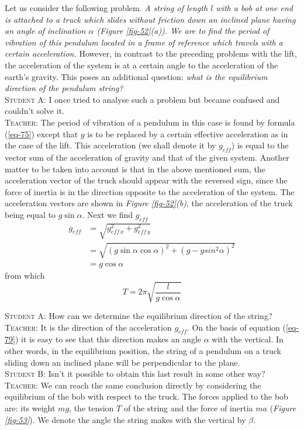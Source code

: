 \documentclass[a4paper,sfsidenotes]{tufte-book}
\begin{document}
Let us consider the following problem. \emph{A string of length $l$ with a bob at one end is attached to a truck which slides without friction down an inclined plane having an angle of inclination $\alpha$ (\emph{Figure \ref{fig-52}(a)}). We are to find the period of vibration of this pendulum located in a frame of reference which travels with a certain acceleration.} However, in contrast to the preceding problems with the lift, the acceleration of the system is at a certain angle to the acceleration of the earth's gravity. This poses an additional question: \emph{what is the equilibrium direction of the pendulum string?}
\\
\textsc{Student A:} I once tried to analyse such a problem but became confused and couldn't solve it.
\\
\textsc{Teacher:} The period of vibration of a pendulum in this case is found by formula (\ref{eq-75}) except that $g$ is to be replaced by a certain effective acceleration as in the case of the lift. This acceleration (we shall denote it by $g_{eff}$) is equal to the vector sum of the acceleration of gravity and that of the given system. Another matter to be taken into account is that in the above mentioned sum, the acceleration vector of the truck should appear with the reversed sign, since the force of inertia is in the direction opposite to the acceleration of the system. The acceleration vectors are shown in \emph{Figure \ref{fig-52}(b)}, the acceleration of the truck being equal to $g \sin \alpha$. Next we find $g_{eff}$
\\
\begin{equation}
\begin{split}
g_{eff} & = \sqrt{g_{eff \,x}^{2} + g_{eff \,y}^{2}} \\
& = \sqrt{ (g \sin \alpha \cos \alpha)^{2} + (g-g sin^{2}\alpha)^{2} }\\
& = g \cos \alpha
\end{split}
\label{eq-79}
\end{equation}
from which
\\
\begin{equation}
T = 2 \pi \sqrt{\frac{l}{g \cos \alpha}}
\label{80}
\end{equation}

\textsc{Student A:} How can we determine the equilibrium direction of the string?
\\
\textsc{Teacher:} It is the direction of the acceleration $g_{eff}$. On the basis of equation (\ref{eq-79}) it is easy to see that this direction makes an angle $\alpha$ with the vertical. In other words, in the equilibrium position, the string of a pendulum on a truck sliding down an inclined plane will be perpendicular to the plane.
\\
\textsc{Student B:} Isn't it possible to obtain this last result in some other way?
\\
\textsc{Teacher:} We can reach the same conclusion directly by considering the equilibrium of the bob with respect to the truck. The forces applied to the bob are: its weight $mg$, the tension $T$ of the string and the force of inertia $ma$ (\emph{Figure \ref{fig-53}}). We denote the angle the string makes with the vertical by $\beta$.
\end{document}
